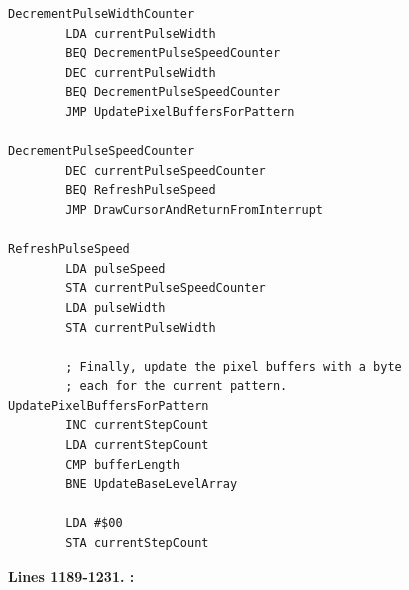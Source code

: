 \clearpage
\begin{lstlisting}[caption=From \icode{MainInterruptHandler}.]
DecrementPulseWidthCounter   
        LDA currentPulseWidth
        BEQ DecrementPulseSpeedCounter
        DEC currentPulseWidth
        BEQ DecrementPulseSpeedCounter
        JMP UpdatePixelBuffersForPattern

DecrementPulseSpeedCounter   
        DEC currentPulseSpeedCounter
        BEQ RefreshPulseSpeed
        JMP DrawCursorAndReturnFromInterrupt

RefreshPulseSpeed   
        LDA pulseSpeed
        STA currentPulseSpeedCounter
        LDA pulseWidth
        STA currentPulseWidth

        ; Finally, update the pixel buffers with a byte
        ; each for the current pattern.        
UpdatePixelBuffersForPattern    
        INC currentStepCount
        LDA currentStepCount
        CMP bufferLength
        BNE UpdateBaseLevelArray

        LDA #$00
        STA currentStepCount

\end{lstlisting}
\clearpage

\textbf{Lines 1189-1231. :} 
\clearpage
